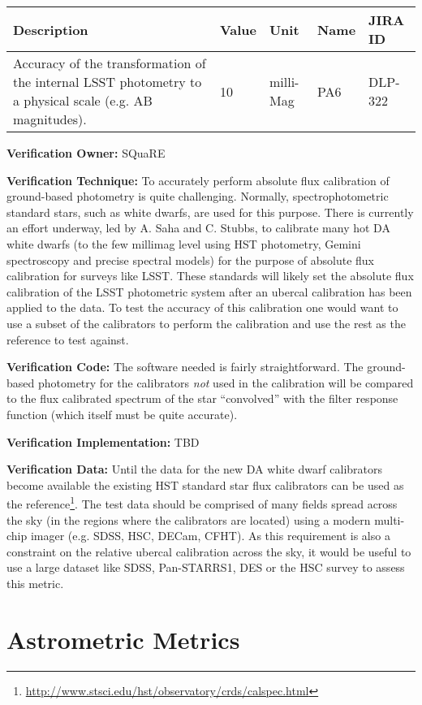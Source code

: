 \documentclass[DM,lsstdraft,toc]{lsstdoc}
\begin{document}
\begin{longtable}[]{@{}p{}llll@{}}
\toprule
Description & Value & Unit & Name & JIRA ID\tabularnewline
\midrule
\endhead
Accuracy of the transformation of the internal LSST photometry to a
physical scale (e.g. AB magnitudes). & 10 & milli-Mag & PA6 &
DLP-322\tabularnewline
\bottomrule
\end{longtable}

\textbf{Verification Owner:} SQuaRE

\textbf{Verification Technique:} To accurately perform absolute flux
calibration of ground-based photometry is quite challenging. Normally,
spectrophotometric standard stars, such as white dwarfs, are used for
this purpose. There is currently an effort underway, led by A. Saha and
C. Stubbs, to calibrate many hot DA white dwarfs (to the few millimag
level using HST photometry, Gemini spectroscopy and precise spectral
models) for the purpose of absolute flux calibration for surveys like
LSST. These standards will likely set the absolute flux calibration of
the LSST photometric system after an ubercal calibration has been
applied to the data. To test the accuracy of this calibration one would
want to use a subset of the calibrators to perform the calibration and
use the rest as the reference to test against.

\textbf{Verification Code:} The software needed is fairly
straightforward. The ground-based photometry for the calibrators
\emph{not} used in the calibration will be compared to the flux
calibrated spectrum of the star ``convolved'' with the filter response
function (which itself must be quite accurate).

\textbf{Verification Implementation:} TBD

\textbf{Verification Data:} Until the data for the new DA white dwarf
calibrators become available the existing HST standard star flux
calibrators can be used as the reference\footnote{\url{http://www.stsci.edu/hst/observatory/crds/calspec.html}}.\protect\hypertarget{_Toc301352570}{}{}
The test data should be comprised of many fields spread across the sky
(in the regions where the calibrators are located) using a modern
multi-chip imager (e.g. SDSS, HSC, DECam, CFHT). As this requirement is
also a constraint on the relative ubercal calibration across the sky, it
would be useful to use a large dataset like SDSS, Pan-STARRS1, DES or
the HSC survey to assess this metric.

\section{Astrometric Metrics}\label{astrometric-metrics}
\end{document}
